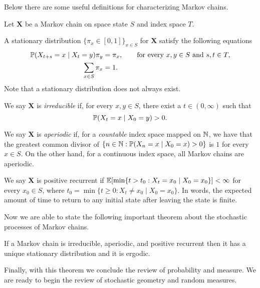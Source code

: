 Below there are some useful definitions for characterizing Markov chains.
\begin{definition} \label{def:markov-defs}
    Let $\bm{X}$ be a Markov chain on space state $S$ and index space $T$.

    A stationary distribution $\{\pi_x \in [0,1]\}_{x\in S}$ for $\bm{X}$ satisfy the following equations
    \begin{align*}
        \P(X_{t+s} = x\mid X_t = y) \pi_y &= \pi_x, \qquad\text{for every }x,y\in S ~\text{and}~ s,t\in T,\\
        \sum_{x\in S} \pi_x &= 1.
    \end{align*}
    Note that a stationary distribution does not always exist.
    
    We say $\bm{X}$ is \textit{irreducible} if, for every $x,y\in S$, there exist a $t \in (0,\infty)$ such that $$\P(X_t = x\mid X_0 = y) > 0.$$
    
    We say $\bm{X}$ is \textit{aperiodic} if, for a \textit{countable} index space mapped on $\N$, we have that the greatest common divisor of $\{n\in\N : \P(X_n = x\mid X_0 = x) > 0 \}$ is $1$ for every $x\in S$.
    On the other hand, for a continuous index space, all Markov chains are aperiodic.
    
    We say $\bm{X}$ is positive recurrent if $\E[\min\{t > t_0 : X_t = x_0 \mid X_0 = x_0\}] < \infty$ for every $x_0\in S$, where $t_0 = \min\{t\ge 0 : X_t\neq x_0 \mid X_0 = x_0 \}$.
    In words, the expected amount of time to return to any initial state after leaving the state is finite.
\end{definition}

Now we are able to state the following important theorem about the stochastic processes of Markov chains.

\begin{theorem} \label{th:Markov_ergodic}
    If a Markov chain is irreducible, aperiodic, and positive recurrent then it has a unique stationary distribution and it is ergodic.
\end{theorem}

Finally, with this theorem we conclude the review of probability and measure.
%
We are ready to begin the review of stochastic geometry and random measures.